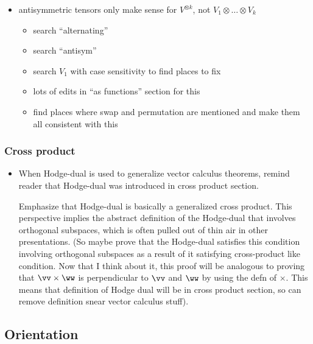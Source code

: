 \begin{itemize}
\begin{itemize}
\begin{itemize}
            
        \end{itemize}
    \end{itemize}
    \item antisymmetric tensors only make sense for $V^{\otimes k}$, not $V_1 \otimes … \otimes V_k$
    \begin{itemize}
        \item search “alternating”
        \item search “antisym”
        \item search $V_1$ with case sensitivity to find places to fix
        \item lots of edits in “as functions” section for this
        \item find places where swap and permutation are mentioned and make them all consistent with this
    \end{itemize}
\end{itemize}

\subsubsection{Cross product}

\begin{itemize}
    \item When Hodge-dual is used to generalize vector calculus theorems, remind reader that Hodge-dual was introduced in cross product section. 
    
    Emphasize that Hodge-dual is basically a generalized cross product. This perspective implies the abstract definition of the Hodge-dual that involves orthogonal subspaces, which is often pulled out of thin air in other presentations. (So maybe prove that the Hodge-dual satisfies this condition involving orthogonal subspaces as a result of it satisfying cross-product like condition. Now that I think about it, this proof will be analogous to proving that $\vv \times \ww$ is perpendicular to $\vv$ and $\ww$ by using the defn of $\times$. This means that definition of Hodge dual will be in cross product section, so can remove definition snear vector calculus stuff).
\end{itemize}

\subsection*{Orientation}

